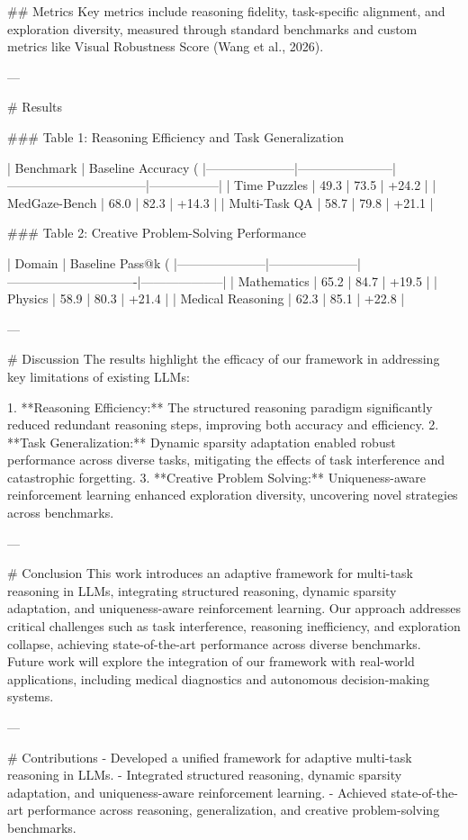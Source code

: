 ## Metrics  
Key metrics include reasoning fidelity, task-specific alignment, and exploration diversity, measured through standard benchmarks and custom metrics like Visual Robustness Score (Wang et al., 2026).  

---

# Results  

### Table 1: Reasoning Efficiency and Task Generalization  

| Benchmark          | Baseline Accuracy (%
|---------------------|-----------------------|---------------------------------|-----------------|  
| Time Puzzles        | 49.3                 | 73.5                           | +24.2           |  
| MedGaze-Bench       | 68.0                 | 82.3                           | +14.3           |  
| Multi-Task QA       | 58.7                 | 79.8                           | +21.1           |  

### Table 2: Creative Problem-Solving Performance  

| Domain             | Baseline Pass@k (%
|---------------------|---------------------|-------------------------------|--------------------|  
| Mathematics         | 65.2               | 84.7                         | +19.5             |  
| Physics             | 58.9               | 80.3                         | +21.4             |  
| Medical Reasoning   | 62.3               | 85.1                         | +22.8             |  

---

# Discussion  
The results highlight the efficacy of our framework in addressing key limitations of existing LLMs:  

1. **Reasoning Efficiency:** The structured reasoning paradigm significantly reduced redundant reasoning steps, improving both accuracy and efficiency.  
2. **Task Generalization:** Dynamic sparsity adaptation enabled robust performance across diverse tasks, mitigating the effects of task interference and catastrophic forgetting.  
3. **Creative Problem Solving:** Uniqueness-aware reinforcement learning enhanced exploration diversity, uncovering novel strategies across benchmarks.  

---

# Conclusion  
This work introduces an adaptive framework for multi-task reasoning in LLMs, integrating structured reasoning, dynamic sparsity adaptation, and uniqueness-aware reinforcement learning. Our approach addresses critical challenges such as task interference, reasoning inefficiency, and exploration collapse, achieving state-of-the-art performance across diverse benchmarks. Future work will explore the integration of our framework with real-world applications, including medical diagnostics and autonomous decision-making systems.  

---

# Contributions  
- Developed a unified framework for adaptive multi-task reasoning in LLMs.  
- Integrated structured reasoning, dynamic sparsity adaptation, and uniqueness-aware reinforcement learning.  
- Achieved state-of-the-art performance across reasoning, generalization, and creative problem-solving benchmarks.  

